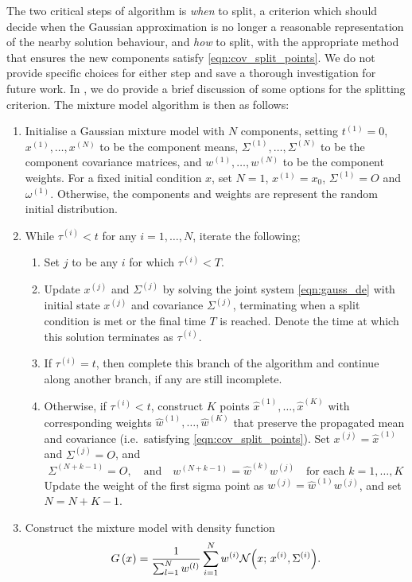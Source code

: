 The two critical steps of algorithm is \emph{when} to split, a criterion which should decide when the Gaussian approximation is no longer a reasonable representation of the nearby solution behaviour, and \emph{how} to split, with the appropriate method that ensures the new components satisfy \cref{eqn:cov_split_points}.
We do not provide specific choices for either step and save a thorough investigation for future work.
In , we do provide a brief discussion of some options for the splitting criterion.
The mixture model algorithm is then as follows:
\begin{enumerate}
	\item Initialise a Gaussian mixture model with \(N\) components, setting \(t^{(1)} = 0\), \(x^{(1)},\dotsc, x^{(N)}\) to be the component means, \(\Sigma^{(1)}, \dotsc, \Sigma^{(N)}\) to be the component covariance matrices, and \(w^{(1)}, \dotsc, w^{(N)}\) to be the component weights.
	      For a fixed initial condition \(x\), set \(N = 1\), \(x^{(1)} = x_0\), \(\Sigma^{(1)} = O\) and \(\omega^{(1)}\).
	      Otherwise, the components and weights are represent the random initial distribution.

	\item While \(\tau^{(i)} < t\) for any \(i = 1,\dotsc, N\), iterate the following;

	      \begin{enumerate}
		      \item Set \(j\) to be any \(i\) for which \(\tau^{(i)} < T\).

		      \item Update \(x^{(j)}\) and \(\Sigma^{(j)}\) by solving the joint system \cref{eqn:gauss_de} with initial state \(x^{(j)}\) and covariance \(\Sigma^{(j)}\), terminating when a split condition is met or the final time \(T\) is reached.
		            Denote the time at which this solution terminates as \(\tau^{(i)}\).

		      \item If \(\tau^{(i)} = t\), then complete this branch of the algorithm and continue along another branch, if any are still incomplete.

		      \item Otherwise, if \(\tau^{(i)} < t\), construct \(K\) points \(\hat{x}^{(1)},\dotsc,\hat{x}^{(K)}\) with corresponding weights \(\hat{w}^{(1)}, \dotsc, \hat{w}^{(K)}\) that preserve the propagated mean and covariance (i.e.\ satisfying \cref{eqn:cov_split_points}).
		            Set \(x^{(j)} = \hat{x}^{(1)}\) and \(\Sigma^{(j)} = O\), and
		            \[
			            \Sigma^{(N + k - 1)} = O, \quad \text{and} \quad w^{(N + k - 1)} = \hat{w}^{(k)} w^{(j)} \quad \text{for each } k = 1,\dotsc,K
		            \]
		            Update the weight of the first sigma point as \(w^{(j)} = \hat{w}^{(1)} w^{(j)}\), and set \(N = N + K - 1\).
	      \end{enumerate}

	\item Construct the mixture model with density function
	      \[
		      G\left(x\right) = \frac{1}{\sum_{l=1}^{N}w^{(l)}}\sum_{i=1}^{N}{w^{(i)}\mathcal{N}\!\left(x; \, x^{(i)}, \Sigma^{(i)}\right)}.
	      \]

\end{enumerate}
